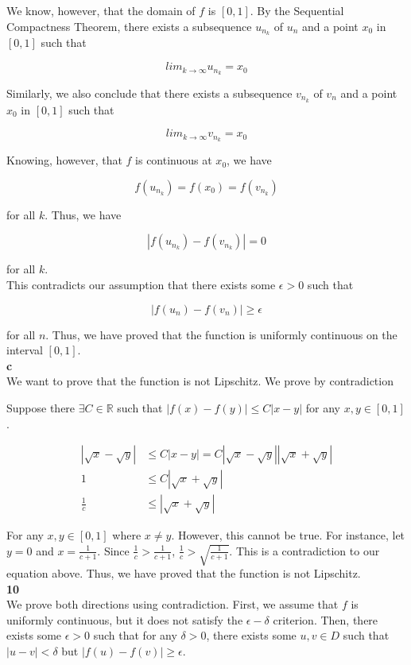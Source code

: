 \documentclass[addpoints]{exam}
\begin{document}
\begin{questions}
We know, however, that the domain of $f$ is $[0, 1]$. By the Sequential Compactness Theorem,
there exists a subsequence ${u_{n_k}}$ of ${u_{n}}$ and a point $x_0$ in $[0, 1]$ such that

\[lim_{k \to \infty} u_{n_k} = x_0\]

Similarly, we also conclude that there exists a subsequence ${v_{n_k}}$ of ${v_{n}}$ and a 
point $x_0$ in $[0, 1]$ such that

\[lim_{k \to \infty} v_{n_k} = x_0\]

Knowing, however, that $f$ is continuous at $x_0$, we have 

\[f(u_{n_k}) = f(x_0) = f(v_{n_k})\]

for all $k$. Thus, we have

\[|f(u_{n_k}) - f(v_{n_k})| = 0\]

for all $k$.\\

This contradicts our assumption that there exists some $\epsilon > 0$ such that

\[|f(u_n) - f(v_n)| \geq \epsilon\]

for all $n$. Thus, we have proved that the function is uniformly continuous on the interval $[0, 1]$.\\

\textbf{c}\\

We want to prove that the function is not Lipschitz. We prove by contradiction


Suppose there $\exists C \in \mathbb{R}$ such that $|f(x) - f(y)| \leq C|x - y|$ for any $x, y \in [0, 1]$. 

\begin{align*}
    |\sqrt{x} - \sqrt{y}| &\leq C|x - y| = C|\sqrt{x} - \sqrt{y}||\sqrt{x} + \sqrt{y}|\\
    1 &\leq C|\sqrt{x} + \sqrt{y}|\\
    \frac{1}{c} &\leq |\sqrt{x} + \sqrt{y}|
\end{align*}

For any $x, y \in [0, 1]$ where $x \neq y$. However, this cannot be true. For instance, let $y = 0$
and $x = \frac{1}{c + 1}$. Since $\frac{1}{c} > \frac{1}{c + 1}$, $\frac{1}{c} > \sqrt{\frac{1}{c + 1}}$. This is 
a contradiction to our equation above. Thus, we have proved that the function is not Lipschitz.\\

\question \textbf{10}\\
We prove both directions using contradiction. First, we assume that $f$ is uniformly continuous, but 
it does not satisfy the $\epsilon - \delta$ criterion. Then, there exists some $\epsilon > 0$
such that for any $\delta > 0$, there exists some $u, v \in D$ such that $|u - v| < \delta$ but 
$|f(u) - f(v)| \geq \epsilon$.\\


\end{questions}
\end{document}

